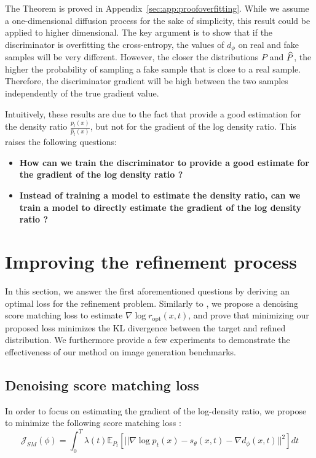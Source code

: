 \begin{hproof}The Theorem is proved in Appendix~\ref{sec:app:proofoverfitting}. While we assume a one-dimensional diffusion process for the sake of simplicity, this result could be applied to higher dimensional. The key argument is to show that if the discriminator is overfitting the cross-entropy, the values of $d_\phi$ on real and fake samples will be very different. However, the closer the distributions $P$ and $\widehat P$, the higher the probability of sampling a fake sample that is close to a real sample. Therefore, the discriminator gradient will be high between the two samples independently of the true gradient value.
\end{hproof}

Intuitively, these results are due to the fact that \citep{kim2023refininggenerativeprocessdiscriminator} provide a good estimation for the density ratio $\frac{p_{t}(x)}{\hat{p}_{t}(x)}$, but not for the gradient of the log density ratio.
This raises the following questions:
\begin{itemize}
    \item \textbf{How can we train the discriminator to provide a good estimate for the gradient of the log density ratio ?}
    \item \textbf{Instead of training a model to estimate the density ratio, can we train a model to directly estimate the gradient of the log density ratio ?}
\end{itemize}
\section{Improving the refinement process}\label{sec:dg:sec3}
In this section, we answer the first aforementioned questions by deriving an optimal loss for the refinement problem.
Similarly to \citep{vincent_connection_2011,song2021scorebasedgenerativemodelingstochastic}, we propose a denoising score matching loss to estimate $\nabla \log r_{\mathrm{opt}}(x,t)$, and prove that minimizing our proposed loss minimizes the KL divergence between the target and refined distribution. We furthermore provide a few experiments to demonstrate the effectiveness of our method on image generation benchmarks.
\subsection{Denoising score matching loss}
In order to focus on estimating the gradient of the log-density ratio, we propose to minimize the following score matching loss : 
\begin{equation}\label{eq:refinement_score_matching}
    \mathcal{J}_{SM}(\phi) = \int_{0}^{T} \lambda(t) \mathbb{E}_{P_{t}}\left[||\nabla \log p_{t}(x) - s_{\theta}(x,t) - \nabla d_{\phi}(x,t) ||^{2}  \right]dt
\end{equation} 

